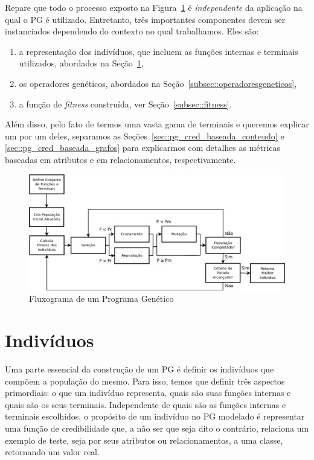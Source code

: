 Repare que todo o processo exposto na Figura~\ref{fig::gpwf} é \textit{independente} da aplicação na qual o \textsc{PG} é utilizado. 
Entretanto, três importantes componentes devem ser instanciados dependendo do contexto no qual trabalhamos. Eles são:
\begin{enumerate}
\item a representação dos indivíduos, que incluem as funções internas e terminais utilizados, abordados na Seção~\ref{subsec::individuos}, 
\item os operadores genéticos, abordados na Seção~\ref{subsec::operadoresgeneticos},
\item a função de \textit{fitness} construída, ver Seção~\ref{subsec::fitness}.
\end{enumerate}
Além disso, pelo fato de termos uma vasta gama de terminais e queremos explicar um por um deles, separamos as Seções~\ref{sec::pg_cred_baseada_conteudo} e \ref{sec::pg_cred_baseada_grafos} para explicarmos com detalhes as métricas baseadas em atributos e em relacionamentos, respectivamente.

\begin{figure}[ht!]
\centering
\includegraphics[width=1.1\textwidth]{figures/gpwf_new.png}
\caption{Fluxograma de um Programa Genético}
\label{fig::gpwf}
\end{figure}

\section{Indivíduos}
\label{subsec::individuos}

Uma parte essencial da construção de um \textsc{PG} é definir os indivíduos que compõem a população do mesmo.
Para isso, temos que definir três aspectos primordiais: o que um indivíduo representa, quais são suas funções internas e quais são os seus terminais. Independente de quais são as funções internas e terminais escolhidos, o propósito de um indivíduo no \textsc{PG} modelado é representar uma função de credibilidade que, a não ser que seja dito o contrário, relaciona um exemplo de teste, seja por seus atributos ou relacionamentos, a uma classe, retornando um valor real. 

